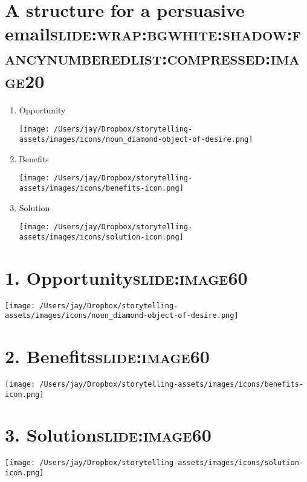 \documentclass[12pt]{article}
\begin{document}
\section[A structure for a persuasive email]{A structure for a persuasive email\hfill{}\textsc{slide:wrap:bgwhite:shadow:fancynumberedlist:compressed:image20}}
\label{sec:org9280e2e}
\begin{enumerate}
\item Opportunity \begin{center}
\texttt{[image: /Users/jay/Dropbox/storytelling-assets/images/icons/noun\_diamond-object-of-desire.png]}
\end{center}
\item Benefits \begin{center}
\texttt{[image: /Users/jay/Dropbox/storytelling-assets/images/icons/benefits-icon.png]}
\end{center}
\item Solution \begin{center}
\texttt{[image: /Users/jay/Dropbox/storytelling-assets/images/icons/solution-icon.png]}
\end{center}
\end{enumerate}

\section[1. Opportunity]{1. Opportunity\hfill{}\textsc{slide:image60}}
\label{sec:org74bc0e6}
\begin{center}
\texttt{[image: /Users/jay/Dropbox/storytelling-assets/images/icons/noun\_diamond-object-of-desire.png]}
\end{center}


\section[2. Benefits]{2. Benefits\hfill{}\textsc{slide:image60}}
\label{sec:org448d992}
\begin{center}
\texttt{[image: /Users/jay/Dropbox/storytelling-assets/images/icons/benefits-icon.png]}
\end{center}


\section[3. Solution]{3. Solution\hfill{}\textsc{slide:image60}}
\label{sec:orgd69a793}
\begin{center}
\texttt{[image: /Users/jay/Dropbox/storytelling-assets/images/icons/solution-icon.png]}
\end{center}
\end{document}
